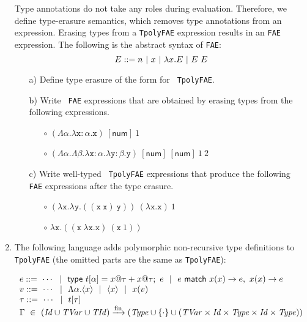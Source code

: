 \begin{enumerate}

Type annotations do not take any roles during evaluation.
Therefore, we define type-erasure semantics, which removes
type annotations from an expression.
Erasing types from a \texttt{TpolyFAE} expression results
in an \texttt{FAE} expression. The following is the abstract syntax of \texttt{FAE}:
\[
  E::= n \ |\ x\ |\ \lambda x.E\ |\ E\ E \\
\]

\begin{itemize}
\item[a)] 
  Define type erasure of the form  for \texttt{ TpolyFAE}.
\end{itemize}

\begin{itemize}
\item[b)] 
  Write \texttt{ FAE} expressions that are obtained by erasing types from the
    following expressions.
    \begin{itemize}
      \item[$\circ$] $(\Lambda\alpha.\lambda \texttt{x}{:}\alpha.\texttt{x})\ [\textsf{num}]\ 1$
      \item[$\circ$]
        $(\Lambda\alpha.\Lambda\beta.\lambda\texttt{x}{:}\alpha.\lambda\texttt{y}{:}\beta.\texttt{y})
        \ [\textsf{num}]\ [\textsf{num}]\ 1\ 2$
    \end{itemize}
\end{itemize}

\begin{itemize}
\item[c)] 
  Write well-typed \texttt{ TpolyFAE} expressions that produce
    the following \texttt{ FAE} expressions after the type erasure.
    \begin{itemize}
      \item[$\circ$] $(\lambda \texttt{x}.\lambda \texttt{y}.((\texttt{x}\ \texttt{x})\ \texttt{y}))\
        (\lambda \texttt{x}.\texttt{x})\ 1$
      \item[$\circ$] $\lambda \texttt{x}.((\texttt{x}\ \lambda \texttt{x}.\texttt{x})\ (\texttt{x}\ 1))$
    \end{itemize}
\end{itemize}

\item The following language adds
polymorphic non-recursive type definitions to \texttt{TpolyFAE}
(the omitted parts are the same as \texttt{TpolyFAE}):

$
  \begin{array}{l}
    e ::=\ \cdots\ \ |\ \ \textsf{type}\ t[\alpha]=x@\tau+x@\tau;\ e\ \ |\ \ 
           e\ \textsf{match}\ x(x)\rightarrow e,\ x(x)\rightarrow e \\
    v ::=\ \cdots\ \ |\ \ \Lambda\alpha.\langle x\rangle\ \ |\ \ \langle x\rangle\ \ |\ \  x(v) \\
    \tau ::=\ \cdots\ \ |\ \  t[\tau] \\
    \Gamma\ \in\ \finmap{(\embox{Id}\cup\embox{TVar}\cup\embox{TId})}
    {(\embox{Type}\cup\{\cdot\}
    \cup(\embox{TVar}\times\embox{Id}\times\embox{Type}\times\embox{Id}\times\embox{Type}))}
  \end{array}
$


\end{enumerate}
